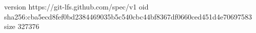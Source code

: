 version https://git-lfs.github.com/spec/v1
oid sha256:cba5ecd8fef0bd2384469035b5c540cbc44bf8367df0660ced451d4e70697583
size 327376

